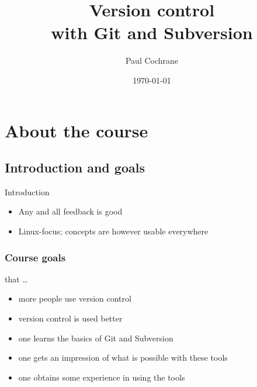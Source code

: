 \documentclass[10pt]{vcs_beamer}
\begin{document}
\author{Paul Cochrane}
\title[Version control with Git and Subversion]
        {Version control\\[0.2em]with Git and Subversion}
\date{\today}

\maketitle

\begin{frame}
\begin{multicols}{2}
\begin{spacing}{0.8}
\tableofcontents
\end{spacing}
\end{multicols}
\end{frame}


\section{About the course}

\subsection{Introduction and goals}
\begin{frame}{Introduction}
\begin{itemize}
    \item Any and all feedback is good
    \item Linux-focus; concepts are however usable everywhere
\end{itemize}


\end{frame}

\begin{frame}
\frametitle{Course goals}
that \ldots
\begin{itemize}
    \item more people use version control
    \item version control is used better
    \item one learns the basics of Git and Subversion
    \item one gets an impression of what is possible with these tools
    \item one obtains some experience in using the tools
\end{itemize}
\end{frame}
\end{document}
